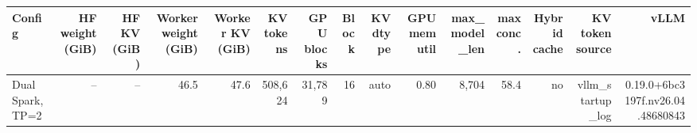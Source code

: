 \begin{tabular}{l r r r r r r r r r r r r r r }
\toprule
Config & HF weight (GiB) & HF KV (GiB) & Worker weight (GiB) & Worker KV (GiB) & KV tokens & GPU blocks & Block & KV dtype & GPU mem util & max\_model\_len & max conc. & Hybrid cache & KV token source & vLLM \\
\midrule
Dual Spark, TP=2 & -- & -- & 46.5 & 47.6 & 508,624 & 31,789 & 16 & auto & 0.80 & 8,704 & 58.4 & no & vllm\_startup\_log & 0.19.0+6bc3197f.nv26.04.48680843 \\
\bottomrule
\end{tabular}
